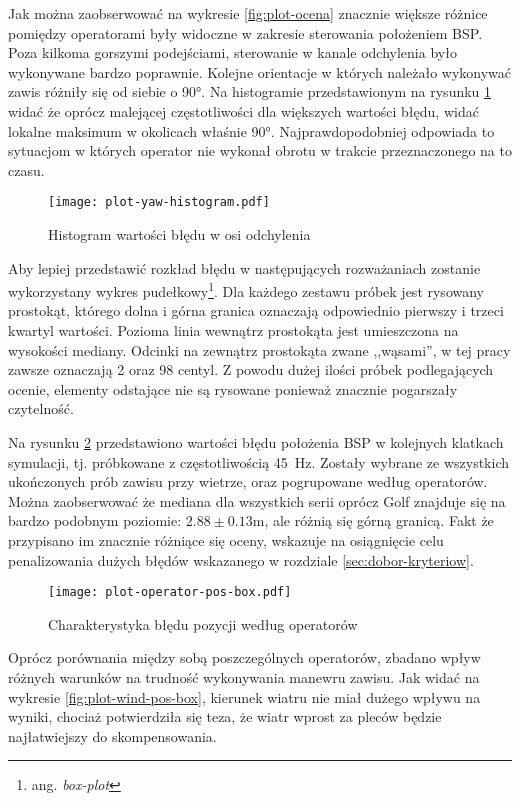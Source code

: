 Jak można zaobserwować na wykresie \ref{fig:plot-ocena} znacznie większe różnice pomiędzy operatorami były widoczne w zakresie sterowania położeniem BSP. Poza kilkoma gorszymi podejściami, sterowanie w kanale odchylenia było wykonywane bardzo poprawnie. Kolejne orientacje w których należało wykonywać zawis różniły się od siebie o 90°. Na histogramie przedstawionym na rysunku \ref{fig:plot-yaw-histogram} widać że oprócz malejącej częstotliwości dla większych wartości błędu, widać lokalne maksimum w okolicach właśnie 90°. Najprawdopodobniej odpowiada to sytuacjom w których operator nie wykonał obrotu w trakcie przeznaczonego na to czasu.

\begin{figure}[!h]
    \centering \texttt{[image: plot-yaw-histogram.pdf]}
    \caption{Histogram wartości błędu w osi odchylenia}
    \label{fig:plot-yaw-histogram}
\end{figure}

Aby lepiej przedstawić rozkład błędu w następujących rozważaniach zostanie wykorzystany wykres pudełkowy\footnote{ang. \emph{box-plot}}. Dla każdego zestawu próbek jest rysowany prostokąt, którego dolna i górna granica oznaczają odpowiednio pierwszy i trzeci kwartyl wartości. Pozioma linia wewnątrz prostokąta jest umieszczona na wysokości mediany. Odcinki na zewnątrz prostokąta zwane ,,wąsami'', w tej pracy zawsze oznaczają 2 oraz 98 centyl. Z powodu dużej ilości próbek podlegających ocenie, elementy odstające nie są rysowane ponieważ znacznie pogarszały czytelność.

Na rysunku \ref{fig:plot-operator-pos-box} przedstawiono wartości błędu położenia BSP w kolejnych klatkach symulacji, tj. próbkowane z częstotliwością 45~Hz. Zostały wybrane ze wszystkich ukończonych prób zawisu przy wietrze, oraz pogrupowane według operatorów. Można zaobserwować że mediana dla wszystkich serii oprócz Golf znajduje się na bardzo podobnym poziomie: $ 2.88 \pm 0.13 \text{m} $, ale różnią się górną granicą. Fakt że przypisano im znacznie różniące się oceny, wskazuje na osiągnięcie celu penalizowania dużych błędów wskazanego w rozdziale \ref{sec:dobor-kryteriow}.

\begin{figure}[!h]
    \centering \texttt{[image: plot-operator-pos-box.pdf]}
    \caption{Charakterystyka błędu pozycji według operatorów}
    \label{fig:plot-operator-pos-box}
\end{figure}

Oprócz porównania między sobą poszczególnych operatorów, zbadano wpływ różnych warunków na trudność wykonywania manewru zawisu. Jak widać na wykresie \ref{fig:plot-wind-pos-box}, kierunek wiatru nie miał dużego wpływu na wyniki, chociaż potwierdziła się teza, że wiatr wprost za pleców będzie najłatwiejszy do skompensowania.

